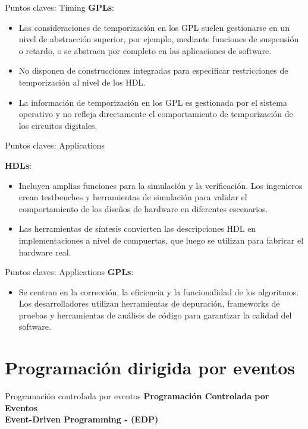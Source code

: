 \documentclass[11pt]{beamer}
\begin{document}
\begin{frame}{Puntos claves: Timing}
	\textbf{GPLs}:
	\begin{itemize}
		\item Las consideraciones de temporización en los GPL suelen gestionarse en un nivel de abstracción superior, por ejemplo, mediante funciones de suspensión o retardo, o se abstraen por completo en las aplicaciones de software.
		\item No disponen de construcciones integradas para especificar restricciones de temporización al nivel de los HDL.
		\item La información de temporización en los GPL es gestionada por el sistema operativo y no refleja directamente el comportamiento de temporización de los circuitos digitales.
	\end{itemize}
\end{frame}

\begin{frame}{Puntos claves: Applications}
	
	\textbf{HDLs}:
	\begin{itemize}
		\item Incluyen amplias funciones para la simulación y la verificación. Los ingenieros crean testbenches y herramientas de simulación para validar el comportamiento de los diseños de hardware en diferentes escenarios.
		\item Las herramientas de síntesis convierten las descripciones HDL en implementaciones a nivel de compuertas, que luego se utilizan para fabricar el hardware real.
	\end{itemize}
\end{frame}

\begin{frame}{Puntos claves: Applications}
	\textbf{GPLs}:
	\begin{itemize}
		\item Se centran en la corrección, la eficiencia y la funcionalidad de los algoritmos. Los desarrolladores utilizan herramientas de depuración, frameworks de pruebas y herramientas de análisis de código para garantizar la calidad del software.
	\end{itemize}
\end{frame}

\section{Programación dirigida por eventos}
	\begin{frame}{Programación controlada por eventos}
		\centering
		\textbf{Programación Controlada por Eventos}\\
		\centering
		\textbf{Event-Driven Programming - (EDP)}
		
	\end{frame}
	
\end{document}
